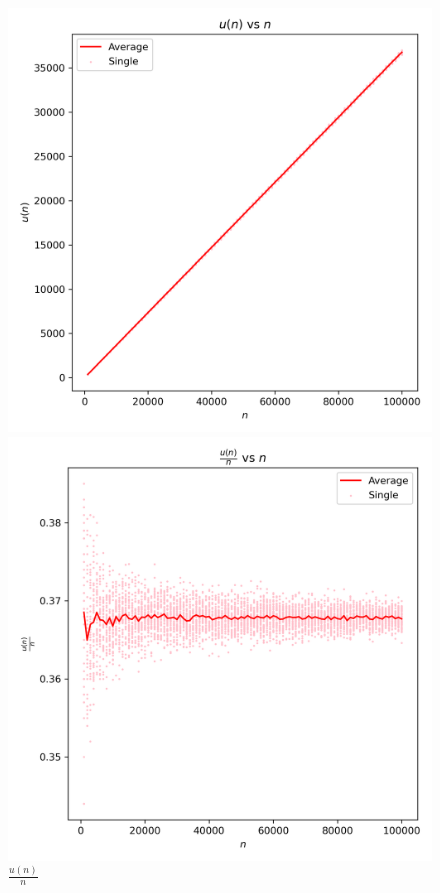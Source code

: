 \documentclass{article}
\begin{document}
\begin{figure}[H]
    \centering
    \begin{minipage}{0.24\textwidth}
        \centering
        \includegraphics[width=\linewidth]{graphs/u_factor_vs_n.png}
        \caption{$u(n)$}
    \end{minipage}
    \begin{minipage}{0.24\textwidth}
        \centering
        \includegraphics[width=\linewidth]{graphs/u_factor_over_n_vs_n.png}
        \caption{$\frac{u(n)}{n}$}
    \end{minipage}
\end{figure}
\end{document}
